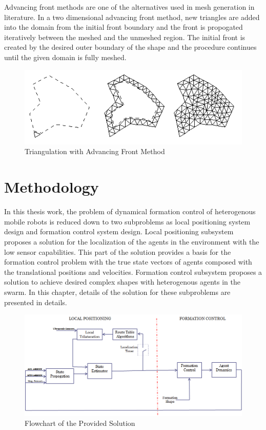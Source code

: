 \documentclass[twoside]{article}
\begin{document}
Advancing front methods are one of the alternatives used in mesh generation in literature.  In a two dimensional advancing front method, new triangles are added into the domain from the initial front boundary and the front is propogated iteratively between the meshed and the unmeshed region. The initial front is created by the desired outer boundary of the shape and the procedure continues until the given domain is fully meshed. 


\begin{figure}[H]
	\caption{Triangulation with Advancing Front Method}
	\centering
	\includegraphics[scale = 1]{advancing}
\end{figure}


\section{Methodology}

In this thesis work, the problem of dynamical formation control of heterogenous mobile robots is reduced down to two subproblems as local positioning system design and formation control system design. Local positioning subsystem proposes  a  solution for the localization of the agents in the environment with the low sensor capabilities. This part of the solution provides a basis for the formation control problem with the true state vectors of agents composed with the translational positions and velocities. Formation control subsystem proposes a solution to achieve desired complex shapes with heterogenous agents in the swarm.  In this chapter, details of the solution for these subproblems are presented in details. 

\begin{figure}[H]
	\caption{Flowchart of the Provided Solution}
	\centering
	\includegraphics[scale = 0.65]{general_scheme}
\end{figure}
\end{document}
